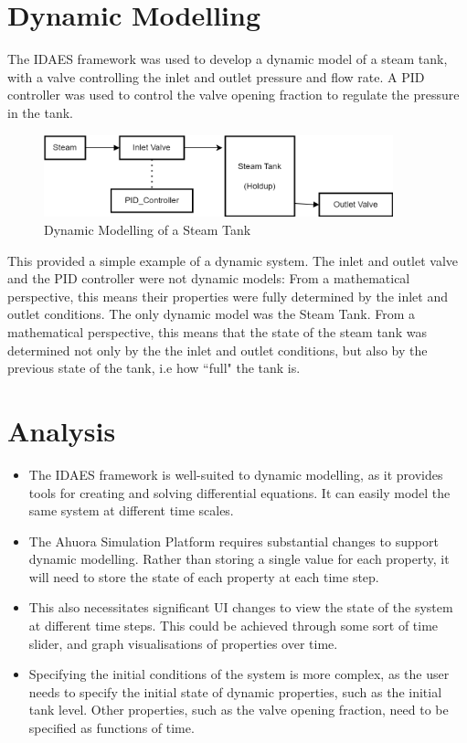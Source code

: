 \section{Dynamic Modelling} 

The IDAES framework was used to develop a dynamic model of a steam tank, with a valve controlling the inlet and outlet pressure and flow rate. A PID controller was used to control the valve opening fraction to regulate the pressure in the tank.

\begin{figure}
    \includegraphics[width=0.9\textwidth]{dynamicmodelling.png}
    \caption{Dynamic Modelling of a Steam Tank}
    \label{fig:dynamicmodelling}
\end{figure}

This provided a simple example of a dynamic system. The inlet and outlet valve and the PID controller were not dynamic models: From a mathematical perspective, this means their properties were fully determined by the inlet and outlet conditions. The only dynamic model was the Steam Tank. From a mathematical perspective, this means that the state of the steam tank was determined not only by the the inlet and outlet conditions, but also by the previous state of the tank, i.e how ``full" the tank is.


\section{Analysis}\label{sec:dynamicmodelling}

\begin{itemize}
    \item The IDAES framework is well-suited to dynamic modelling, as it provides tools for creating and solving differential equations. It can easily model the same system at different time scales.
    \item The Ahuora Simulation Platform requires substantial changes to support dynamic modelling. Rather than storing a single value for each property, it will need to store the state of each property at each time step.
    \item This also necessitates significant UI changes to view the state of the system at different time steps. This could be achieved through some sort of time slider, and graph visualisations of properties over time.
    \item Specifying the initial conditions of the system is more complex, as the user needs to specify the initial state of dynamic properties, such as the initial tank level. Other properties, such as the valve opening fraction, need to be specified as functions of time.
\end{itemize}

